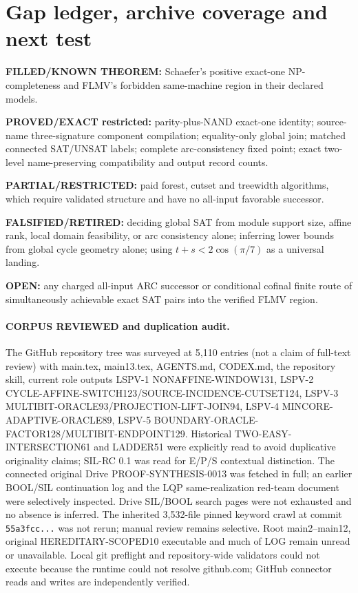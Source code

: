 \documentclass[11pt]{article}
\begin{document}
\section{Gap ledger, archive coverage and next test}
\noindent\textbf{FILLED/KNOWN THEOREM:} Schaefer's positive exact-one NP-completeness and FLMV's forbidden same-machine region in their declared models.
\par\noindent\textbf{PROVED/EXACT restricted:} parity-plus-NAND exact-one identity; source-name three-signature component compilation; equality-only global join; matched connected SAT/UNSAT labels; complete arc-consistency fixed point; exact two-level name-preserving compatibility and output record counts.
\par\noindent\textbf{PARTIAL/RESTRICTED:} paid forest, cutset and treewidth algorithms, which require validated structure and have no all-input favorable successor.
\par\noindent\textbf{FALSIFIED/RETIRED:} deciding global SAT from module support size, affine rank, local domain feasibility, or arc consistency alone; inferring lower bounds from global cycle geometry alone; using \(t+s<2\cos(\pi/7)\) as a universal landing.
\par\noindent\textbf{OPEN:} any charged all-input ARC successor or conditional cofinal finite route of simultaneously achievable exact SAT pairs into the verified FLMV region.

\paragraph{CORPUS REVIEWED and duplication audit.}
The GitHub repository tree was surveyed at 5,110 entries (not a claim of full-text review) with main.tex, main13.tex, AGENTS.md, CODEX.md, the repository skill, current role outputs LSPV-1 NONAFFINE-WINDOW131, LSPV-2 CYCLE-AFFINE-SWITCH123/SOURCE-INCIDENCE-CUTSET124, LSPV-3 MULTIBIT-ORACLE93/PROJECTION-LIFT-JOIN94, LSPV-4 MINCORE-ADAPTIVE-ORACLE89, LSPV-5 BOUNDARY-ORACLE-FACTOR128/MULTIBIT-ENDPOINT129. Historical TWO-EASY-INTERSECTION61 and LADDER51 were explicitly read to avoid duplicative originality claims; SIL-RC 0.1 was read for E/P/S contextual distinction. The connected original Drive PROOF-SYNTHESIS-0013 was fetched in full; an earlier BOOL/SIL continuation log and the LQP same-realization red-team document were selectively inspected. Drive SIL/BOOL search pages were not exhausted and no absence is inferred. The inherited 3,532-file pinned keyword crawl at commit \texttt{55a3fcc...} was not rerun; manual review remains selective. Root main2--main12, original HEREDITARY-SCOPED10 executable and much of LOG remain unread or unavailable. Local git preflight and repository-wide validators could not execute because the runtime could not resolve github.com; GitHub connector reads and writes are independently verified.
\end{document}
